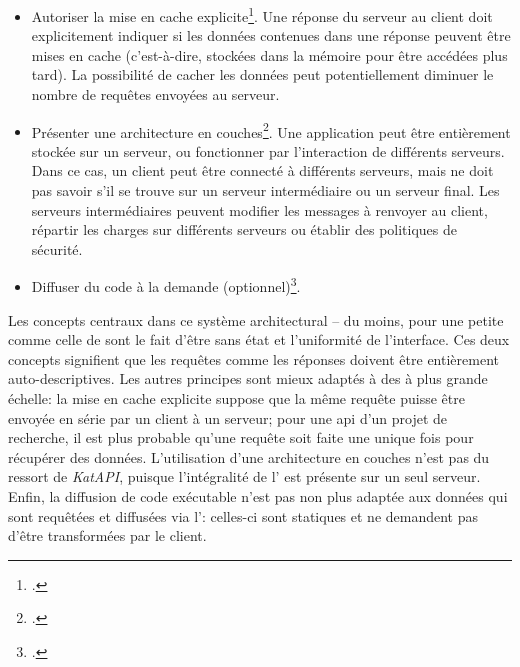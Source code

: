 \begin{itemize}
\begin{itemize}
	\end{itemize}
	\item Autoriser la mise en cache explicite\footcite[p. 79-81]{fielding_architectural_2000}. Une réponse du serveur au client doit explicitement indiquer si les données contenues dans une réponse peuvent être mises en cache (c'est-à-dire, stockées dans la mémoire pour être accédées plus tard). La possibilité de cacher les données peut potentiellement diminuer le nombre de requêtes envoyées au serveur.
	\item Présenter une architecture en couches\footcite[p. 82-84]{fielding_architectural_2000}. Une application peut être entièrement stockée sur un serveur, ou fonctionner par l'interaction de différents serveurs. Dans ce cas, un client peut être connecté à différents serveurs, mais ne doit pas savoir s'il se trouve sur un serveur intermédiaire ou un serveur final. Les serveurs intermédiaires peuvent modifier les messages à renvoyer au client, répartir les charges sur différents serveurs ou établir des politiques de sécurité.
	\item Diffuser du code à la demande (optionnel)\footcite[p. 84-85]{fielding_architectural_2000}.
\end{itemize}

Les concepts centraux dans ce système architectural -- du moins, pour une petite \api{} comme celle de \ktb{} sont le fait d'être sans état et l'uniformité de l'interface. Ces deux concepts signifient que les requêtes comme les réponses doivent être entièrement auto-descriptives. Les autres principes sont mieux adaptés à des \api{} à plus grande échelle: la mise en cache explicite suppose que la même requête puisse être envoyée en série par un client à un serveur; pour une \gls{api} d'un projet de recherche, il est plus probable qu'une requête soit faite une unique fois pour récupérer des données. L'utilisation d'une architecture en couches n'est pas du ressort de \textit{KatAPI}, puisque l'intégralité de l'\api{} est présente sur un seul serveur. Enfin, la diffusion de code exécutable n'est pas non plus adaptée aux données qui sont requêtées et diffusées via l'\api{}: celles-ci sont statiques et ne demandent pas d'être transformées par le client.

